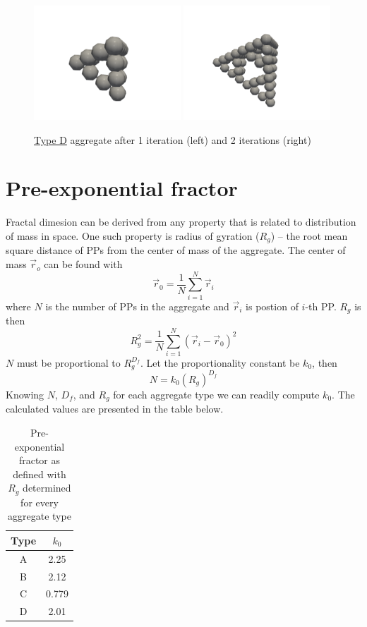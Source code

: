 \documentclass{article}
\begin{document}
\begin{figure}[htp]
\includegraphics[width=0.49\textwidth]{resources/type-d-img-2.png}
\includegraphics[width=0.49\textwidth]{resources/type-d-img-3.png}
\caption*{\underline{Type D} aggregate after 1 iteration (left) and 2 iterations (right)}
\end{figure}

\section*{Pre-exponential fractor}

Fractal dimesion can be derived from any property that is related to distribution of mass in space. One such property is radius of gyration ($R_g$) -- the root mean square distance of PPs from the center of mass of the aggregate. The center of mass $\vec{r}_o$ can be found with
$$
	\vec{r}_0=\frac{1}{N}\sum_{i=1}^{N}{\vec{r}_i}
$$
where $N$ is the number of PPs in the aggregate and $\vec{r}_i$ is postion of $i$-th PP. $R_g$ is then
$$
	R_g^2=\frac{1}{N}\sum_{i=1}^{N}{(\vec{r}_i-\vec{r}_0)^2}
$$
$N$ must be proportional to $R_g^{D_f}$. Let the proportionality constant be $k_0$, then
$$
	N=k_0(R_g)^{D_f}
$$
Knowing $N$, $D_f$, and $R_g$ for each aggregate type we can readily compute $k_0$. The calculated values are presented in the table below.

\begin{table}[htp]
\centering
\begin{tabular}{c c}
\hline
	Type & $k_0$\\
\hline
	A & 2.25\\
	B & 2.12\\
	C & 0.779\\
	D & 2.01\\
\hline
\end{tabular}
\caption*{Pre-exponential fractor as defined with $R_g$ determined for every aggregate type}
\end{table}
\end{document}
